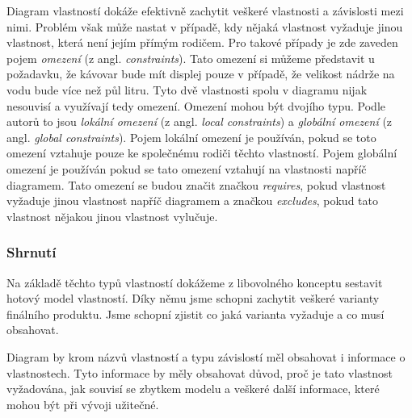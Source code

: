 Diagram vlastností dokáže efektivně zachytit veškeré vlastnosti a závislosti mezi nimi. Problém však může nastat v případě, kdy nějaká vlastnost vyžaduje jinou vlastnost, která není jejím přímým rodičem. Pro takové případy je zde zaveden pojem \textit{omezení} (z angl. \textit{constraints}). Tato omezení si můžeme představit u požadavku, že kávovar bude mít displej pouze v případě, že velikost nádrže na vodu bude více než půl litru. Tyto dvě vlastnosti spolu v diagramu nijak nesouvisí a využívají tedy omezení. Omezení mohou být dvojího typu. Podle autorů \cite{Pas05} to jsou \textit{lokální omezení} (z angl. \textit{local constraints}) a \textit{globální omezení} (z angl. \textit{global constraints}). Pojem lokální omezení je používán, pokud se toto omezení vztahuje pouze ke společnému rodiči těchto vlastností. Pojem globální omezení je používán pokud se tato omezení vztahují na vlastnosti napříč diagramem. Tato omezení se budou značit značkou \textit{requires}, pokud vlastnost vyžaduje jinou vlastnost napříč diagramem a značkou \textit{excludes}, pokud tato vlastnost nějakou jinou vlastnost vylučuje.


\subsubsection{Shrnutí}
Na základě těchto typů vlastností dokážeme z libovolného konceptu sestavit hotový model vlastností. Díky němu jsme schopni zachytit veškeré varianty finálního produktu. Jsme schopní zjistit co jaká varianta vyžaduje a co musí obsahovat. 

Diagram by krom názvů vlastností a typu závislostí měl obsahovat i informace o vlastnostech. Tyto informace by měly obsahovat důvod, proč je tato vlastnost vyžadována, jak souvisí se zbytkem modelu a veškeré další informace, které mohou být při vývoji užitečné. 







